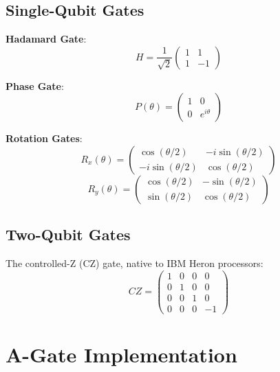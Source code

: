 \documentclass[11pt,a4paper]{article}
\begin{document}
\subsection{Single-Qubit Gates}

\textbf{Hadamard Gate}:
\begin{equation}
H = \frac{1}{\sqrt{2}} \begin{pmatrix} 1 & 1 \\ 1 & -1 \end{pmatrix}
\end{equation}

\textbf{Phase Gate}:
\begin{equation}
P(\theta) = \begin{pmatrix} 1 & 0 \\ 0 & e^{i\theta} \end{pmatrix}
\end{equation}

\textbf{Rotation Gates}:
\begin{equation}
R_x(\theta) = \begin{pmatrix} \cos(\theta/2) & -i\sin(\theta/2) \\ -i\sin(\theta/2) & \cos(\theta/2) \end{pmatrix}
\end{equation}
\begin{equation}
R_y(\theta) = \begin{pmatrix} \cos(\theta/2) & -\sin(\theta/2) \\ \sin(\theta/2) & \cos(\theta/2) \end{pmatrix}
\end{equation}

\subsection{Two-Qubit Gates}

The controlled-Z (CZ) gate, native to IBM Heron processors:
\begin{equation}
CZ = \begin{pmatrix} 1 & 0 & 0 & 0 \\ 0 & 1 & 0 & 0 \\ 0 & 0 & 1 & 0 \\ 0 & 0 & 0 & -1 \end{pmatrix}
\end{equation}

\section{A-Gate Implementation}
\end{document}
